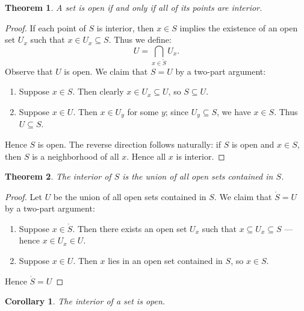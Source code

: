 \documentclass[11pt]{article}
\newtheorem{theorem}{Theorem}
\newtheorem{corollary}{Corollary}
\begin{document}
\begin{theorem}
  A set is open if and only if all of its points are interior.
\end{theorem}
\begin{adjustwidth}{0.5cm}{}
  \begin{proof}
    If each point of $S$ is interior, then $x \in S$ implies the existence of an open set $U_{x}$ such that $x \in U_{x} \subseteq S$. Thus we define:
    \[
      U = \bigcap\limits_{x \in \mathring{S}} U_{x}.
    \]
    Observe that $U$ is open. We claim that $S = U$ by a two-part argument:
    \begin{enumerate}
      \item Suppose $x \in S$. Then clearly $x \in U_{x} \subseteq U$, so $S \subseteq U$.
      \item Suppose $x \in U$. Then $x \in U_{y}$ for some $y$; since $U_{y} \subseteq S$, we have $x \in S$. Thus $U \subseteq S$.
    \end{enumerate}
    Hence $S$ is open. The reverse direction follows naturally: if $S$ is open and $x \in S$, then $S$ is a neighborhood of all $x$. Hence all $x$ is interior.
  \end{proof}
\end{adjustwidth}

\begin{theorem}
  The interior of $S$ is the union of all open sets contained in $S$.
\end{theorem}
\begin{adjustwidth}{0.5cm}{}
  \begin{proof}
    Let $U$ be the union of all open sets contained in $S$. We claim that $\mathring{S} = U$ by a two-part argument:
    \begin{enumerate}
      \item Suppose $x \in \mathring{S}$. Then there exists an open set $U_{x}$ such that $x \subseteq U_{x} \subseteq S$ --- hence $x \in U_{x} \in U$.
      \item Suppose $x \in U$. Then $x$ lies in an open set contained in $S$, so $x \in S$.
    \end{enumerate}
    Hence $\mathring{S} = U$
  \end{proof}
\end{adjustwidth}

\begin{corollary}
  The interior of a set is open.
\end{corollary}

\newpage
\end{document}

